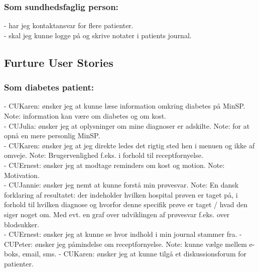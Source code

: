 \subsubsection*{Som sundhedsfaglig person:}
- har jeg kontaktansvar for flere patienter.\\
- skal jeg kunne logge på og skrive notater i patients journal.\\
\subsection{Furture User Stories}
\subsubsection*{Som diabetes patient:}
- CUKaren: ønsker jeg at kunne læse information omkring diabetes på MinSP. Note: information kan være om diabetes og om kost.\\
- CUJulia: ønsker jeg at oplysninger om mine diagnoser er adskilte. Note: for at opnå en mere personlig MinSP.\\
- CUKaren: ønsker jeg at jeg direkte ledes det rigtig sted hen i menuen og ikke af omveje. Note: Brugervenlighed f.eks. i forhold til receptfornyelse.\\ 
- CUErnest: ønsker jeg at modtage reminders om kost og motion. Note: Motivation. \\
- CUJannie: ønsker jeg nemt at kunne forstå min prøvesvar. Note: En dansk forklaring af resultatet: der indeholder hvilken hospital prøven er taget på, i forhold til hvilken diagnose og hvorfor denne specifik prøve er taget / hvad den siger noget om. Med evt. en graf over udviklingen af prøvesvar f.eks. over blodsukker.\\
- CUErnest: ønsker jeg at kunne se hvor indhold i min journal stammer fra.
- CUPeter: ønsker jeg påmindelse om receptfornyelse. Note: kunne vælge mellem e-boks, email, sms.
- CUKaren: ønsker jeg at kunne tilgå et diskussionsforum for patienter.\\
%
